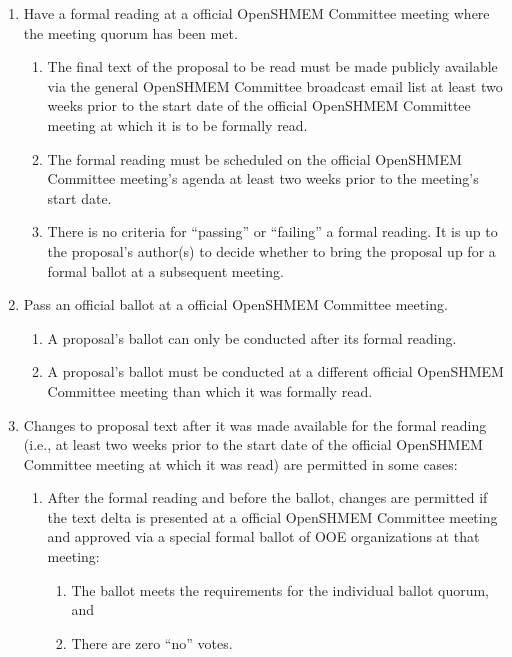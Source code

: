 \begin{enumerate}
\item Have a formal reading at a official OpenSHMEM Committee meeting where the
  meeting quorum has been met.
  \begin{enumerate}
  \item The final text of the proposal to be read must be made
    publicly available via the general OpenSHMEM Committee broadcast email list
    at least two weeks prior to the start date of the official OpenSHMEM
    Committee meeting at which it is to be formally read.
  \item The formal reading must be scheduled on the official OpenSHMEM Committee
    meeting's agenda at least two weeks prior to the meeting's start
    date.
  \item There is no criteria for ``passing'' or ``failing'' a formal
    reading.  It is up to the proposal's author(s) to decide whether
    to bring the proposal up for a formal ballot at a subsequent
    meeting.
  \end{enumerate}

\item Pass an official ballot at a official OpenSHMEM Committee meeting.
  \begin{enumerate}
  \item A proposal's ballot can only be conducted after its
    formal reading.
  \item A proposal's ballot must be conducted at a different
    official OpenSHMEM Committee meeting than which it was formally read.
  \end{enumerate}

\item Changes to proposal text after it was made available for the
  formal reading (i.e., at least two weeks prior to the start date of
  the official OpenSHMEM Committee meeting at which it was read) are permitted
  in some cases:
  \begin{enumerate}
  \item After the formal reading and before the ballot, changes are permitted if the text
    delta is presented at a official OpenSHMEM Committee meeting and approved
    via a special formal ballot of OOE organizations at that
    meeting:
    \begin{enumerate}
    \item The ballot meets the requirements for the individual
      ballot quorum, and
    \item There are zero ``no'' votes.
    \end{enumerate}


\end{enumerate}
\end{enumerate}
